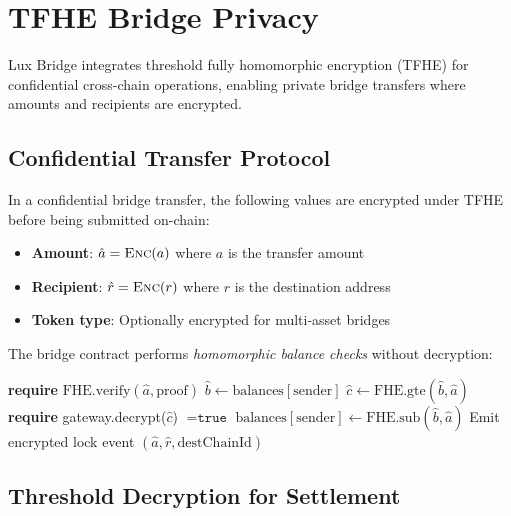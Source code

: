 \section{TFHE Bridge Privacy}
\label{sec:tfhe}

Lux Bridge integrates threshold fully homomorphic encryption (TFHE) for confidential cross-chain operations, enabling private bridge transfers where amounts and recipients are encrypted.

\subsection{Confidential Transfer Protocol}

In a confidential bridge transfer, the following values are encrypted under TFHE before being submitted on-chain:

\begin{itemize}[leftmargin=1.1em]
  \item \textbf{Amount}: $\hat{a} = \textsc{Enc}(a)$ where $a$ is the transfer amount
  \item \textbf{Recipient}: $\hat{r} = \textsc{Enc}(r)$ where $r$ is the destination address
  \item \textbf{Token type}: Optionally encrypted for multi-asset bridges
\end{itemize}

The bridge contract performs \emph{homomorphic balance checks} without decryption:

\begin{algorithm}[H]
\caption{Confidential Bridge Lock}
\begin{algorithmic}[1]
    \State \textbf{require} $\text{FHE.verify}(\hat{a}, \text{proof})$ 
    \State $\hat{b} \gets \text{balances}[\text{sender}]$ 
    \State $\hat{c} \gets \text{FHE.gte}(\hat{b}, \hat{a})$ 
    \State \textbf{require} gateway.decrypt($\hat{c}$) $= \texttt{true}$ 
    \State $\text{balances}[\text{sender}] \gets \text{FHE.sub}(\hat{b}, \hat{a})$
    \State Emit encrypted lock event $(\hat{a}, \hat{r}, \text{destChainId})$
\EndFunction
\end{algorithmic}
\end{algorithm}

\subsection{Threshold Decryption for Settlement}

